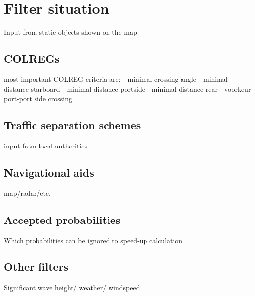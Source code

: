 \chapter*{Filter situation}
Input from static objects shown on the map

\section*{COLREGs}
most important COLREG criteria are:
- minimal crossing angle
- minimal distance starboard
- minimal distance portside
- minimal distance rear
- voorkeur port-port side crossing

\section*{Traffic separation schemes}
input from local authorities

\section*{Navigational aids}
map/radar/etc.

\section*{Accepted probabilities}
Which probabilities can be ignored to speed-up calculation

\section*{Other filters}
Significant wave height/ weather/ windspeed

